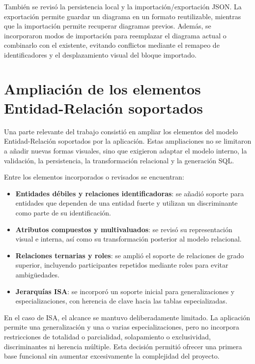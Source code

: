 También se revisó la persistencia local y la importación/exportación JSON. La exportación permite guardar un diagrama en un formato reutilizable, mientras que la importación permite recuperar diagramas previos. Además, se incorporaron modos de importación para reemplazar el diagrama actual o combinarlo con el existente, evitando conflictos mediante el remapeo de identificadores y el desplazamiento visual del bloque importado.

\section{Ampliación de los elementos Entidad-Relación soportados}

Una parte relevante del trabajo consistió en ampliar los elementos del modelo Entidad-Relación soportados por la aplicación. Estas ampliaciones no se limitaron a añadir nuevas formas visuales, sino que exigieron adaptar el modelo interno, la validación, la persistencia, la transformación relacional y la generación SQL.

Entre los elementos incorporados o revisados se encuentran:

\begin{itemize}
    \item \textbf{Entidades débiles y relaciones identificadoras}: se añadió soporte para entidades que dependen de una entidad fuerte y utilizan un discriminante como parte de su identificación.

    \item \textbf{Atributos compuestos y multivaluados}: se revisó su representación visual e interna, así como su transformación posterior al modelo relacional.

    \item \textbf{Relaciones ternarias y roles}: se amplió el soporte de relaciones de grado superior, incluyendo participantes repetidos mediante roles para evitar ambigüedades.

    \item \textbf{Jerarquías ISA}: se incorporó un soporte inicial para generalizaciones y especializaciones, con herencia de clave hacia las tablas especializadas.
\end{itemize}

En el caso de ISA, el alcance se mantuvo deliberadamente limitado. La aplicación permite una generalización y una o varias especializaciones, pero no incorpora restricciones de totalidad o parcialidad, solapamiento o exclusividad, discriminantes ni herencia múltiple. Esta decisión permitió ofrecer una primera base funcional sin aumentar excesivamente la complejidad del proyecto.


